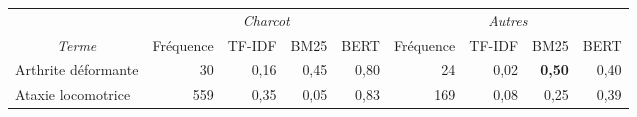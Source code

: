\begin{landscape}
\thispagestyle{mylandscape} 
\begin{table}[]
\centering
\begin{tabular}{|l|cccc|cccc|}
\hline
\multicolumn{1}{|c|}{}                                 & \multicolumn{4}{c|}{\cellcolor[HTML]{FFFC9E}\textit{Charcot}}                                        & \multicolumn{4}{c|}{\cellcolor[HTML]{CBCEFB}\textit{Autres}}                                         \\ \cline{2-9} 
\multicolumn{1}{|c|}{\multirow{}{}{\textit{Terme}}} & \multicolumn{1}{c|}{Fréquence} & \multicolumn{1}{c|}{\textsc{TF-IDF}} & \multicolumn{1}{c|}{\textsc{BM25}} & \textsc{BERT} & \multicolumn{1}{c|}{Fréquence} & \multicolumn{1}{c|}{\textsc{TF-IDF}} & \multicolumn{1}{c|}{\textsc{BM25}} & \textsc{BERT} \\ \hline
Arthrite déformante                                    & \multicolumn{1}{r|}{30}         & \multicolumn{1}{r|}{0,16}   & \multicolumn{1}{r|}{0,45} & \multicolumn{1}{r|}{0,80}      & \multicolumn{1}{r|}{24}         & \multicolumn{1}{r|}{0,02}   & \multicolumn{1}{r|}{\textbf{0,50}} & \multicolumn{1}{r|}{0,40}      \\ \hline
Ataxie locomotrice                                     & \multicolumn{1}{r|}{559}        & \multicolumn{1}{r|}{0,35}   & \multicolumn{1}{r|}{0,05} & \multicolumn{1}{r|}{0,83}      & \multicolumn{1}{r|}{169}        & \multicolumn{1}{r|}{0,08}   & \multicolumn{1}{r|}{0,25} & \multicolumn{1}{r|}{0,39}      \\ \hline

\end{tabular}
\end{table}
\end{landscape}

